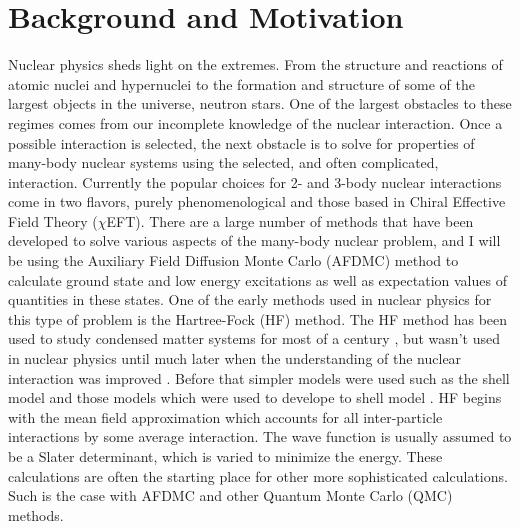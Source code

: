 \section{Background and Motivation}
Nuclear physics sheds light on the extremes. From the structure and reactions of atomic nuclei and hypernuclei to the formation and structure of some of the largest objects in the universe, neutron stars. One of the largest obstacles to these regimes comes from our incomplete knowledge of the nuclear interaction. Once a possible interaction is selected, the next obstacle is to solve for properties of many-body nuclear systems using the selected, and often complicated, interaction. Currently the popular choices for 2- and 3-body nuclear interactions come in two flavors, purely phenomenological and those based in Chiral Effective Field Theory ($\chi$EFT). There are a large number of methods that have been developed to solve various aspects of the many-body nuclear problem, and I will be using the Auxiliary Field Diffusion Monte Carlo (AFDMC) method to calculate ground state and low energy excitations as well as expectation values of quantities in these states. One of the early methods used in nuclear physics for this type of problem is the Hartree-Fock (HF) method. The HF method has been used to study condensed matter systems for most of a century \cite{hartree1928, fock1930, slater1951}, but wasn't used in nuclear physics until much later when the understanding of the nuclear interaction was improved \cite{zofka1970, gogny1986}. Before that simpler models were used such as the shell model and those models which were used to develope to shell model \cite{mayer1950_1,mayer1950_2}. HF begins with the mean field approximation which accounts for all inter-particle interactions by some average interaction. The wave function is usually assumed to be a Slater determinant, which is varied to minimize the energy. These calculations are often the starting place for other more sophisticated calculations. Such is the case with AFDMC and other Quantum Monte Carlo (QMC) methods.

